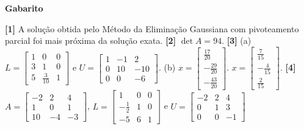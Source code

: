 \documentclass[12pt,a4paper]{article}
\begin{document}
\begin{center}
\textbf{Gabarito}
\end{center} 
\textbf{[1]} A solução obtida pelo Método da Eliminação Gaussiana com pivoteamento parcial foi mais próxima da solução exata. 
\textbf{[2]} $\det A = 94$.
\textbf{[3]} (a) $L = \begin{bmatrix}1 & 0 & 0 \\ 3 & 1 & 0 \\ 5 & \frac{3}{10} & 1\end{bmatrix}$ e 
$U = \begin{bmatrix} 1 & -1 & 2 \\ 0 & 10 & -10 \\ 0 & 0 & -6 \end{bmatrix}$. 
(b) $x = 
\begin{bmatrix}
\frac{17}{20} \\
-\frac{29}{20} \\
-\frac{43}{20}
\end{bmatrix}
$. 
$x = 
\begin{bmatrix}
\frac{7}{15} \\
-\frac{4}{15} \\
\frac{2}{15}
\end{bmatrix}
$. 
\textbf{[4]} $A = \begin{bmatrix}-2 & 2 & 4 \\ 1 & 0 & 1\\ 10 & -4 & -3\end{bmatrix}$, 
$L = \begin{bmatrix}1 & 0 & 0 \\ -\frac{1}{2} & 1 & 0 \\ -5 & 6 & 1\end{bmatrix}$ e  
$U = \begin{bmatrix}-2 & 2 & 4 \\ 0 & 1 & 3 \\ 0 & 0 & -1\end{bmatrix}$
\end{document}
